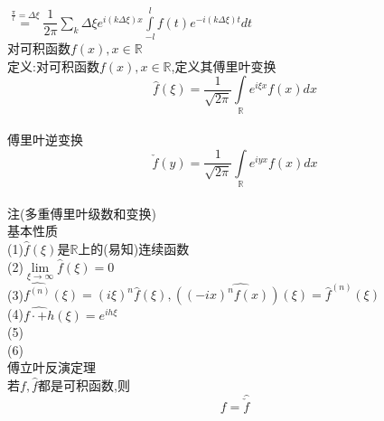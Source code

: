 \documentclass[11pt, a4paper, UTF8]{ctexart}
\begin{document}
$\overset{\frac{\pi}{l}=\Delta\xi}{=}\dfrac{1}{2\pi}\sum\limits_k\Delta\xi e^{i(k\Delta\xi)x}\int\limits_{-l}^lf(t)e^{-i(k\Delta\xi)t}dt$\\
对可积函数$f(x),x\in\mathbb{R}$\\
定义:对可积函数$f(x),x\in\mathbb{R}$,定义其傅里叶变换\\
$$\hat{f}(\xi)=\dfrac{1}{\sqrt{2\pi}}\int\limits_{\mathbb{R}}e^{i\xi x}f(x)dx$$\\
傅里叶逆变换\\
$$\check{f}(y)=\dfrac{1}{\sqrt{2\pi}}\int\limits_{\mathbb{R}}e^{iyx}f(x)dx$$\\
注(多重傅里叶级数和变换)\\
基本性质\\
(1)$\hat{f}(\xi)$是$\mathbb{R}$上的(易知)连续函数\\
(2)$\lim\limits_{\xi\to\infty}\hat{f}(\xi)=0$\\
(3)$\hat{f^(n)}(\xi)=(i\xi)^n\hat{f}(\xi),\widehat{((-ix)^nf(x))(\xi)}=\hat{f}^{(n)}(\xi)$\\
(4)$\widehat{f\cdot+h}(\xi)=e^{ih\xi}$\\
(5)\\
(6)\\
傅立叶反演定理\\
若$f,\hat{f}$都是可积函数,则\\
$$f=\hat{\check{f}}$$
\end{document}
